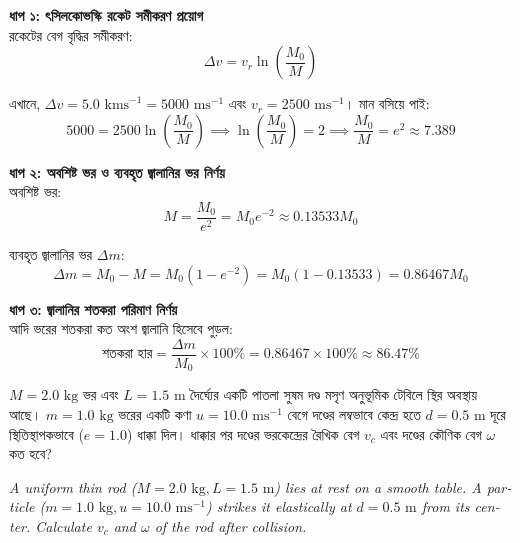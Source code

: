 \documentclass[12pt, a4paper]{article}
\begin{document}
\begin{tcolorbox}[solutionbox={সমাধান (Solution)}]
\noindent
\textbf{ধাপ ১: ৎসিলকোভস্কি রকেট সমীকরণ প্রয়োগ} \\
রকেটের বেগ বৃদ্ধির সমীকরণ:
\[\Delta v = v_r \ln\left(\frac{M_0}{M}\right)\]

এখানে, $\Delta v = 5.0\text{ kms}^{-1} = 5000\text{ ms}^{-1}$ এবং $v_r = 2500\text{ ms}^{-1}$। মান বসিয়ে পাই:
\[5000 = 2500 \ln\left(\frac{M_0}{M}\right) \implies \ln\left(\frac{M_0}{M}\right) = 2 \implies \frac{M_0}{M} = e^2 \approx 7.389\]

\vspace{0.5em}
\noindent\textbf{ধাপ ২: অবশিষ্ট ভর ও ব্যবহৃত জ্বালানির ভর নির্ণয়} \\
অবশিষ্ট ভর:
\[M = \frac{M_0}{e^2} = M_0 e^{-2} \approx 0.13533 M_0\]

ব্যবহৃত জ্বালানির ভর $\Delta m$:
\[\Delta m = M_0 - M = M_0(1 - e^{-2}) = M_0(1 - 0.13533) = 0.86467 M_0\]

\vspace{0.5em}
\noindent\textbf{ধাপ ৩: জ্বালানির শতকরা পরিমাণ নির্ণয়} \\
আদি ভরের শতকরা কত অংশ জ্বালানি হিসেবে পুড়ল:
\[\text{শতকরা হার} = \frac{\Delta m}{M_0} \times 100\% = 0.86467 \times 100\% \approx \mathbf{86.47\%}\]
\end{tcolorbox}
\begin{tcolorbox}[questionbox={প্রশ্ন (Question) 42}]
\noindent
$M = 2.0\text{ kg}$ ভর এবং $L = 1.5\text{ m}$ দৈর্ঘ্যের একটি পাতলা সুষম দণ্ড মসৃণ অনুভূমিক টেবিলে স্থির অবস্থায় আছে। $m = 1.0\text{ kg}$ ভরের একটি কণা $u = 10.0\text{ ms}^{-1}$ বেগে দণ্ডের লম্বভাবে কেন্দ্র হতে $d = 0.5\text{ m}$ দূরে স্থিতিস্থাপকভাবে ($e = 1.0$) ধাক্কা দিল। ধাক্কার পর দণ্ডের ভরকেন্দ্রের রৈখিক বেগ $v_c$ এবং দণ্ডের কৌণিক বেগ $\omega$ কত হবে?
\vspace{0.8em}
\begin{english}
\noindent\textit{\color{darkgray}
A uniform thin rod ($M = 2.0\text{ kg}, L = 1.5\text{ m}$) lies at rest on a smooth table. A particle ($m = 1.0\text{ kg}, u = 10.0\text{ ms}^{-1}$) strikes it elastically at $d = 0.5\text{ m}$ from its center. Calculate $v_c$ and $\omega$ of the rod after collision.
}
\end{english}
\end{tcolorbox}
\end{document}
